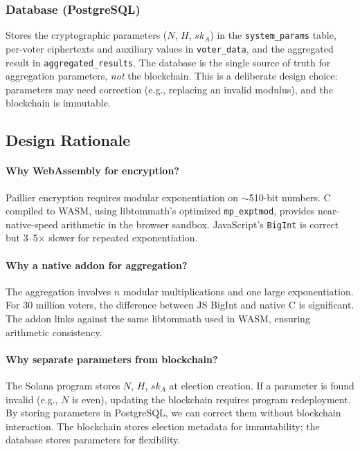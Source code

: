 \documentclass[11pt, a4paper]{article}
\begin{document}
\subsubsection{Database (PostgreSQL)}
Stores the cryptographic parameters ($N$, $H$, $sk_A$) in the \texttt{system\_params} table, per-voter ciphertexts and auxiliary values in \texttt{voter\_data}, and the aggregated result in \texttt{aggregated\_results}. The database is the single source of truth for aggregation parameters, \emph{not} the blockchain. This is a deliberate design choice: parameters may need correction (e.g., replacing an invalid modulus), and the blockchain is immutable.

\subsection{Design Rationale}

\paragraph{Why WebAssembly for encryption?} Paillier encryption requires modular exponentiation on $\sim$510-bit numbers. C compiled to WASM, using libtommath's optimized \texttt{mp\_exptmod}, provides near-native-speed arithmetic in the browser sandbox. JavaScript's \texttt{BigInt} is correct but 3--5$\times$ slower for repeated exponentiation.

\paragraph{Why a native addon for aggregation?} The aggregation involves $n$ modular multiplications and one large exponentiation. For 30 million voters, the difference between JS BigInt and native C is significant. The addon links against the same libtommath used in WASM, ensuring arithmetic consistency.

\paragraph{Why separate parameters from blockchain?} The Solana program stores $N$, $H$, $sk_A$ at election creation. If a parameter is found invalid (e.g., $N$ is even), updating the blockchain requires program redeployment. By storing parameters in PostgreSQL, we can correct them without blockchain interaction. The blockchain stores election metadata for immutability; the database stores parameters for flexibility.
\end{document}
